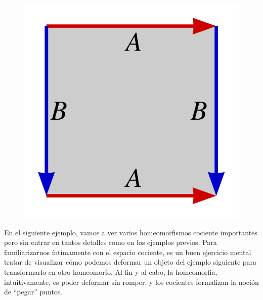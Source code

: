 \begin{exa}
	\begin{figure}[h!]
		\centering
		\includegraphics[scale = 0.1]{img/pol_fund_toro}
	\end{figure}
\end{exa}

En el siguiente ejemplo, vamos a ver varios homeomorfismos cociente importantes pero sin entrar en tantos detalles como en los ejemplos previos. Para familiarizarnos íntimamente con el espacio cociente, es un buen ejercicio mental tratar de visualizar cómo podemos deformar un objeto del ejemplo siguiente para transformarlo en otro homeomorfo. Al fin y al cabo, la homeomorfia, intuitivamente, es poder deformar sin romper, y los cocientes formalizan la noción de ``pegar'' puntos.

